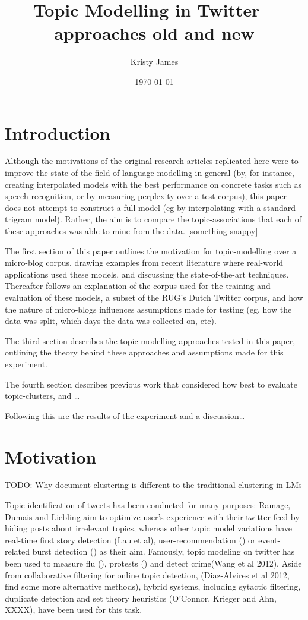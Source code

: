 \documentclass{article}
\title{Topic Modelling in Twitter – approaches old and new}
\author{Kristy James}
\date{\today}
\begin{document}
 
\maketitle
 
\section{Introduction}

 Although the motivations of the original research articles replicated here were to improve the state of the field of language modelling in general (by, for instance, creating interpolated models with the best performance on concrete tasks such as speech recognition, or by measuring perplexity over a test corpus), this paper does not attempt to construct a full model (eg by interpolating with a standard trigram model). Rather, the aim is to compare the topic-associations that each of these approaches was able to mine from the data. 
[something snappy]

The first section of this paper outlines the motivation for topic-modelling over a micro-blog corpus, drawing examples from recent literature where real-world applications used these models, and discussing the state-of-the-art techniques. Thereafter follows an explanation of the corpus used for the training and evaluation of these models, a subset of the RUG’s Dutch Twitter corpus, and how the nature of micro-blogs influences assumptions made for testing (eg. how the data was split, which days the data was collected on, etc).

The third section describes the topic-modelling approaches tested in this paper, outlining the theory behind these approaches and assumptions made for this experiment.

The fourth section describes previous work that considered how best to evaluate topic-clusters, and …

Following this are the results of the experiment and a discussion…


 
\section{Motivation}

TODO: Why document clustering is different to the traditional clustering in LMs
 
Topic identification of tweets has been conducted for many purposes:
Ramage, Dumais and Liebling aim to optimize user's experience with their twitter feed by hiding posts about irrelevant topics, whereas other topic model variations have real-time first story detection (Lau et al), user-recommendation () or event-related burst detection () as their aim. Famously, topic modeling on twitter has been used to measure flu (), protests () and detect crime(Wang et al 2012).
Aside from collaborative filtering for online topic detection, (Diaz-Alvires et al 2012, find some more alternative methods), hybrid systems, including sytactic filtering, duplicate detection and set theory heuristics (O'Connor, Krieger and Ahn, XXXX), have been used for this task.
\end{document}
